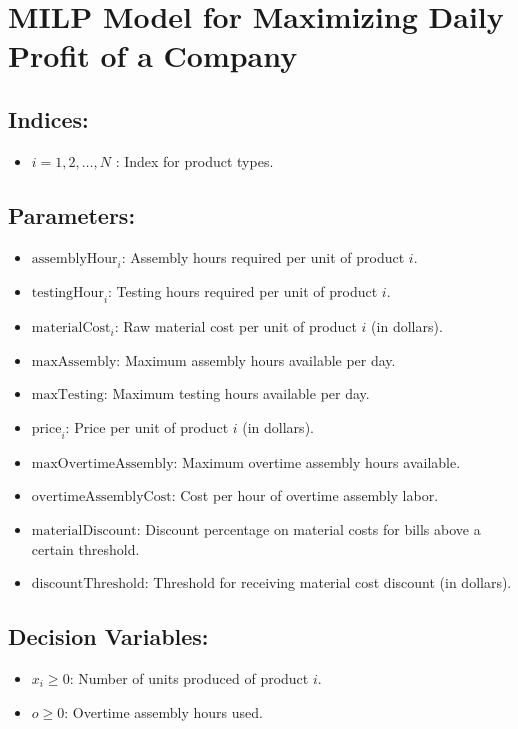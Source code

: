 \documentclass{article}
\begin{document}
\section*{MILP Model for Maximizing Daily Profit of a Company}

\subsection*{Indices:}
\begin{itemize}
    \item \(i = 1, 2, \ldots, N\) : Index for product types.
\end{itemize}

\subsection*{Parameters:}
\begin{itemize}
    \item \(\text{assemblyHour}_i\): Assembly hours required per unit of product \(i\).
    \item \(\text{testingHour}_i\): Testing hours required per unit of product \(i\).
    \item \(\text{materialCost}_i\): Raw material cost per unit of product \(i\) (in dollars).
    \item \(\text{maxAssembly}\): Maximum assembly hours available per day.
    \item \(\text{maxTesting}\): Maximum testing hours available per day.
    \item \(\text{price}_i\): Price per unit of product \(i\) (in dollars).
    \item \(\text{maxOvertimeAssembly}\): Maximum overtime assembly hours available.
    \item \(\text{overtimeAssemblyCost}\): Cost per hour of overtime assembly labor.
    \item \(\text{materialDiscount}\): Discount percentage on material costs for bills above a certain threshold.
    \item \(\text{discountThreshold}\): Threshold for receiving material cost discount (in dollars).
\end{itemize}

\subsection*{Decision Variables:}
\begin{itemize}
    \item \(x_i \geq 0\): Number of units produced of product \(i\).
    \item \(o \geq 0\): Overtime assembly hours used.
\end{itemize}
\end{document}
